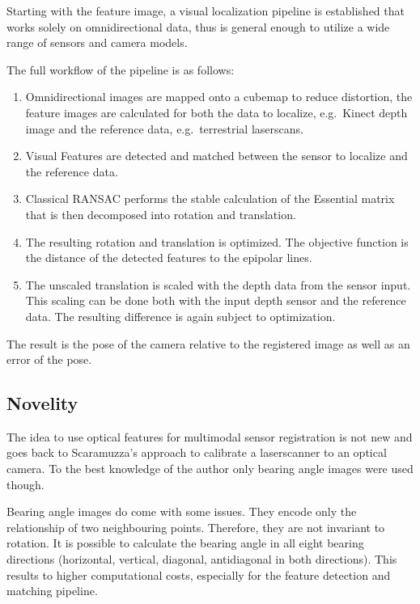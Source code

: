 \documentclass[doktyp=marbeit,fontsize=12pt,sprache=english,draft=true,hausschrift=true]{TUBAFarbeiten}
\begin{document}
Starting with the feature image, a visual localization pipeline is
established that works solely on omnidirectional data, thus is general
enough to utilize a wide range of sensors and camera models.

The full workflow of the pipeline is as follows:

\begin{enumerate}
\item Omnidirectional images are mapped onto a cubemap to reduce distortion,
  the feature images are calculated for both the data to localize,
  e.g.~Kinect depth image and the reference data, e.g.~terrestrial
  laserscans.
\item Visual Features are detected and matched between the sensor to
  localize and the reference data.
\item Classical RANSAC performs the stable calculation of the
  Essential matrix that is then decomposed into rotation and translation.
\item The resulting rotation and translation is optimized. The objective
  function is the distance of the detected features to the epipolar
  lines.
\item The unscaled translation is scaled with the depth data from the sensor
  input. This scaling can be done both with the input depth sensor and
  the reference data. The resulting difference is again subject to
  optimization.
\end{enumerate}

The result is the pose of the camera relative to the registered image as well as an error of the pose.

\subsection{Novelity}\label{novelity}

The idea to use optical features for multimodal sensor registration is
not new and goes back to Scaramuzza's approach to calibrate a
laserscanner to an optical camera. To the best knowledge of the author
only bearing angle images were used though.

Bearing angle images do come with some issues. They encode only the
relationship of two neighbouring points. Therefore, they are not
invariant to rotation. It is possible to calculate the bearing angle in
all eight bearing directions (horizontal, vertical, diagonal, antidiagonal in
both directions). This results to higher computational costs, especially
for the feature detection and matching pipeline.
\end{document}
